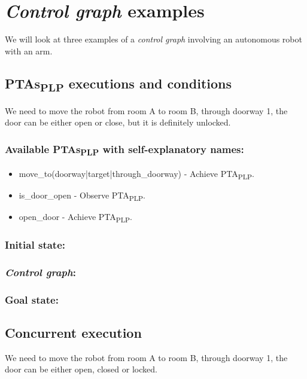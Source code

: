 \chapter{\textit{Control graph} examples}
We will look at three examples of a \textit{control graph} involving an autonomous robot with an arm. \\
\section{PTAs\textsubscript{PLP} executions and conditions}
We need to move the robot from room A to room B, through doorway 1, the door can be either open or close, but it is definitely unlocked. \\
\subsection{Available PTAs\textsubscript{PLP} with self-explanatory names:}
\begin{itemize}
\item move_to(doorway|target|through_doorway) - Achieve PTA\textsubscript{PLP}.
\item is_door_open - Observe PTA\textsubscript{PLP}.
\item open_door - Achieve PTA\textsubscript{PLP}.
\end{itemize}
\subsection{Initial state: }
 \clearpage
\subsection{\textit{Control graph}: }
 \subsection{Goal state: }
 \section{Concurrent execution \label{example_concurrent_execution}}
We need to move the robot from room A to room B, through doorway 1, the door can be either open, closed or locked. \\
